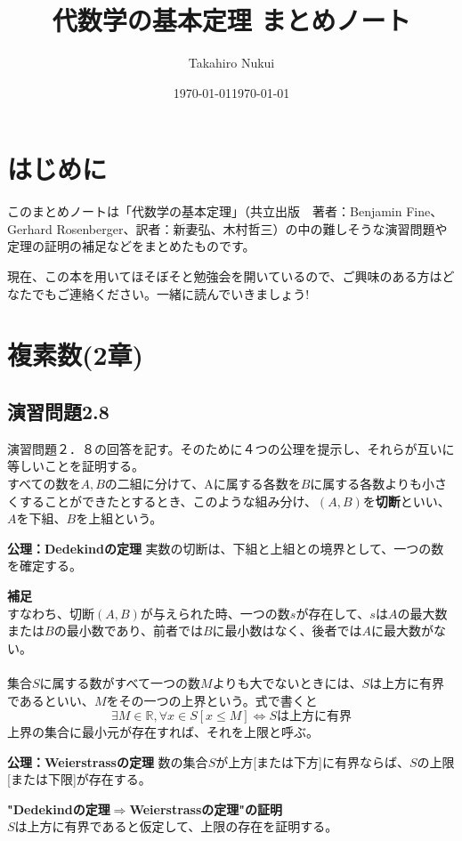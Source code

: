 \documentclass[10pt]{jarticle}
\title{代数学の基本定理 まとめノート}
\author{Takahiro Nukui}
\date{\today}
\begin{document}
\maketitle
\tableofcontents

\newpage

\section{はじめに}
このまとめノートは「代数学の基本定理」（共立出版　著者：Benjamin Fine、Gerhard Rosenberger、訳者：新妻弘、木村哲三）の中の難しそうな演習問題や定理の証明の補足などをまとめたものです。\date{\today}現在、この本を用いてほそぼそと勉強会を開いているので、ご興味のある方はどなたでもご連絡ください。一緒に読んでいきましょう!

\newpage


\section{複素数(2章)}
\subsection{演習問題2.8}
演習問題２．８の回答を記す。そのために４つの公理を提示し、それらが互いに等しいことを証明する。\\


 すべての数を$A,B$の二組に分けて、Aに属する各数を$B$に属する各数よりも小さくすることができたとするとき、このような組み分け、$(A,B)$を\textbf{切断}といい、$A$を下組、$B$を上組という。
\begin{itembox}[l]{\textbf{公理：Dedekindの定理}}
実数の切断は、下組と上組との境界として、一つの数を確定する。
\end{itembox}
\textbf{補足}\\
すなわち、切断$(A,B)$が与えられた時、一つの数$s$が存在して、$s$は$A$の最大数または$B$の最小数であり、前者では$B$に最小数はなく、後者では$A$に最大数がない。
\\
\\


集合$S$に属する数がすべて一つの数$M$よりも大でないときには、$S$は上方に有界であるといい、$M$をその一つの上界という。式で書くと
\[\exists M\in\mathbb{R},\forall x\in S[x\leq M] \Longleftrightarrow Sは上方に有界\]
上界の集合に最小元が存在すれば、それを上限と呼ぶ。
\begin{itembox}[l]{\textbf{公理：Weierstrassの定理}}
数の集合$S$が上方[または下方]に有界ならば、$S$の上限[または下限]が存在する。
\end{itembox}
\textbf{"Dedekindの定理$\Longrightarrow$Weierstrassの定理"の証明}\\
$S$は上方に有界であると仮定して、上限の存在を証明する。
\end{document}
